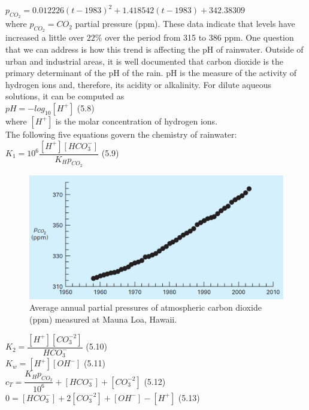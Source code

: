 \documentclass[../main.tex]{subfiles}
\begin{document}
$p_{CO_2} = 0.012226(t - 1983)^2 + 1.418542(t - 1983) + 342.38309$\\

\noindent where $p_{CO_2} = CO_2$ partial pressure (ppm). These data indicate that levels have increased a
little over $22\%$ over the period from 315 to 386 ppm.
One question that we can address is how this trend is affecting the pH of rainwater.
Outside of urban and industrial areas, it is well documented that carbon dioxide is the primary
determinant of the pH of the rain. pH is the measure of the activity of hydrogen ions
and, therefore, its acidity or alkalinity. For dilute aqueous solutions, it can be computed as\\

$pH=-log_{10}[H^+]$
\hfill (5.8)\\

\noindent where $[H^+]$ is the molar concentration of hydrogen ions.\\
\noindent The following five equations govern the chemistry of rainwater:\\

$K_1 = 10^6 \dfrac{[H^+][HCO^-_3]}{K_H p_{CO_2}}$
\hfill (5.9)\\

\begin{figure}[h]
    \includegraphics[width=0.7\linewidth]{./images/fig_5_10}
    \caption{Average annual partial pressures of atmospheric carbon dioxide (ppm) measured at Mauna Loa,
    Hawaii.}
\end{figure}

$K_2=\dfrac{[H^+][CO^{-2}_3]}{HCO^-_3}$
\hfill (5.10)\\

$K_w = [H^+][OH^-]$
\hfill (5.11)\\

$c_T=\dfrac{K_H p_{CO_2}}{10^6}+[HCO^-_3]+[CO^{-2}_3]$
\hfill (5.12)\\

$0=[HCO^-_3]+2[CO^{-2}_3]+[OH^-]-[H^+]$
\hfill (5.13)\\
\newpage
\end{document}
